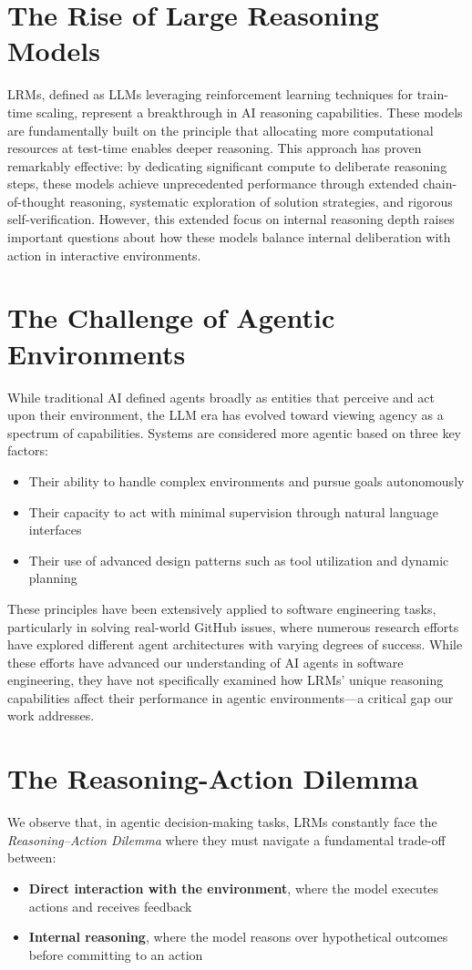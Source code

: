 \section{The Rise of Large Reasoning Models}
LRMs, defined as LLMs leveraging reinforcement learning techniques for train-time scaling, represent a breakthrough in AI reasoning capabilities. These models are fundamentally built on the principle that allocating more computational resources at test-time enables deeper reasoning. This approach has proven remarkably effective: by dedicating significant compute to deliberate reasoning steps, these models achieve unprecedented performance through extended chain-of-thought reasoning, systematic exploration of solution strategies, and rigorous self-verification. However, this extended focus on internal reasoning depth raises important questions about how these models balance internal deliberation with action in interactive environments.

\section{The Challenge of Agentic Environments}
While traditional AI defined agents broadly as entities that perceive and act upon their environment, the LLM era has evolved toward viewing agency as a spectrum of capabilities. Systems are considered more agentic based on three key factors:
\begin{itemize}
    \item Their ability to handle complex environments and pursue goals autonomously
    \item Their capacity to act with minimal supervision through natural language interfaces
    \item Their use of advanced design patterns such as tool utilization and dynamic planning
\end{itemize}

These principles have been extensively applied to software engineering tasks, particularly in solving real-world GitHub issues, where numerous research efforts have explored different agent architectures with varying degrees of success. While these efforts have advanced our understanding of AI agents in software engineering, they have not specifically examined how LRMs' unique reasoning capabilities affect their performance in agentic environments—a critical gap our work addresses.

\section{The Reasoning-Action Dilemma}
We observe that, in agentic decision-making tasks, LRMs constantly face the \emph{Reasoning–Action Dilemma} where they must navigate a fundamental trade-off between:
\begin{itemize}
    \item \textbf{Direct interaction with the environment}, where the model executes actions and receives feedback
    \item \textbf{Internal reasoning}, where the model reasons over hypothetical outcomes before committing to an action
\end{itemize}


